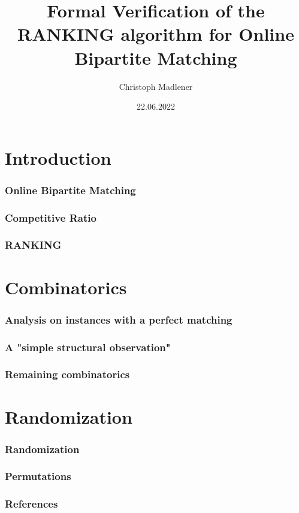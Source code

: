 \documentclass{beamer}
\title{Formal Verification of the RANKING algorithm for Online Bipartite Matching}
\author{Christoph Madlener}
\date{22.06.2022}
\begin{document}
\begin{frame}[plain]
  \titlepage
\end{frame}

\section{Introduction}
\begin{frame}
  \frametitle{Online Bipartite Matching}
\end{frame}

\begin{frame}
  \frametitle{Competitive Ratio}
\end{frame}

\begin{frame}
  \frametitle{RANKING}
  \cite{karp1990}
  \cite{birnbaum2008}
\end{frame}

\section{Combinatorics}
\begin{frame}
  \frametitle{Analysis on instances with a perfect matching}
\end{frame}

\begin{frame}
  \frametitle{A "simple structural observation"}
  \cite{abdulaziz2019}
\end{frame}

\begin{frame}
  \frametitle{Remaining combinatorics}
\end{frame}

\section{Randomization}
\begin{frame}
  \frametitle{Randomization}
\end{frame}

\begin{frame}
  \frametitle{Permutations}
\end{frame}

\begin{frame}
  \frametitle{References}
  
  
\end{frame}
\end{document}
